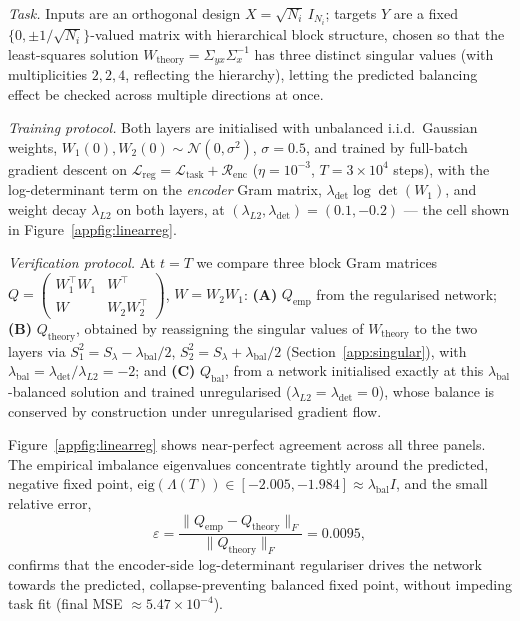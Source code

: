 \documentclass{article} %
\theoremstyle{remark}
\begin{document}
\emph{Task.} Inputs are an orthogonal design $X=\sqrt{N_i}\,I_{N_i}$; targets
$Y$ are a fixed $\{0,\pm1/\sqrt{N_i}\}$-valued matrix with hierarchical block
structure, chosen so that the least-squares solution
$W_{\mathrm{theory}}=\Sigma_{yx}\Sigma_x^{-1}$ has three distinct singular
values (with multiplicities $2,2,4$, reflecting the hierarchy), letting the
predicted balancing effect be checked across multiple directions at once.

\emph{Training protocol.} Both layers are initialised with unbalanced i.i.d.\
Gaussian weights, $W_1(0),W_2(0)\sim\mathcal N(0,\sigma^2)$, $\sigma=0.5$, and
trained by full-batch gradient descent on
$\mathcal{L}_{\mathrm{reg}}=\mathcal{L}_{\mathrm{task}}+\mathcal{R}_{\mathrm{enc}}$
($\eta=10^{-3}$, $T=3\times10^4$ steps), with the log-determinant term on the
\emph{encoder} Gram matrix, $\lambda_{\det}\log\det(W_1)$, and weight decay
$\lambda_{L2}$ on both layers, at $(\lambda_{L2},\lambda_{\det})=(0.1,-0.2)$ —
the cell shown in Figure~\ref{appfig:linearreg}.

\emph{Verification protocol.} At $t=T$ we compare three block Gram matrices
$Q=\begin{pmatrix}W_1^\top W_1 & W^\top\\ W & W_2W_2^\top\end{pmatrix}$,
$W=W_2W_1$: \textbf{(A)} $Q_{\mathrm{emp}}$ from the regularised network;
\textbf{(B)} $Q_{\mathrm{theory}}$, obtained by reassigning the singular
values of $W_{\mathrm{theory}}$ to the two layers via
$S_1^2=S_\lambda-\lambda_{\mathrm{bal}}/2$,
$S_2^2=S_\lambda+\lambda_{\mathrm{bal}}/2$
(Section~\ref{app:singular}), with
$\lambda_{\mathrm{bal}}=\lambda_{\det}/\lambda_{L2}=-2$; and \textbf{(C)}
$Q_{\mathrm{bal}}$, from a network initialised exactly at this
$\lambda_{\mathrm{bal}}$-balanced solution and trained unregularised
($\lambda_{L2}=\lambda_{\det}=0$), whose balance is conserved by construction
under unregularised gradient flow.

Figure~\ref{appfig:linearreg} shows near-perfect agreement across all
three panels. The empirical imbalance eigenvalues concentrate tightly around
the predicted, negative fixed point,
$\mathrm{eig}(\Lambda(T))\in[-2.005,-1.984]\approx\lambda_{\mathrm{bal}}I$, and
the small relative error,
\[
\varepsilon
=
\frac{\lVert Q_{\mathrm{emp}} - Q_{\mathrm{theory}} \rVert_F}
{\lVert Q_{\mathrm{theory}} \rVert_F}
=
0.0095,
\]
confirms that the encoder-side log-determinant regulariser drives the
network towards the predicted, collapse-preventing balanced fixed point,
without impeding task fit (final MSE $\approx5.47\times10^{-4}$).
\end{document}
